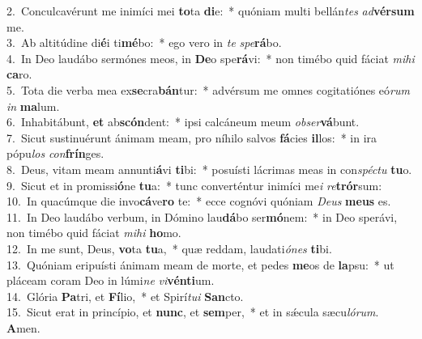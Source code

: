 {2.~}Conculcavérunt me inimíci mei \textbf{to}ta \textbf{di}e:~* quóniam multi bellán\textit{tes} \textit{ad}\textbf{vér}\textbf{sum} me.\\
{3.~}Ab altitúdine di\textbf{é}i ti\textbf{mé}bo:~* ego vero in \textit{te} \textit{spe}\textbf{rá}bo.\\
{4.~}In Deo laudábo sermónes meos, in \textbf{De}o spe\textbf{rá}vi:~* non timébo quid fáciat \textit{mi}\textit{hi} \textbf{ca}ro.\\
{5.~}Tota die verba mea ex\textbf{se}cra\textbf{bán}tur:~* advérsum me omnes cogitatiónes eó\textit{rum} \textit{in} \textbf{ma}lum.\\
{6.~}Inhabitábunt, \textbf{et} ab\textbf{scón}dent:~* ipsi calcáneum meum \textit{ob}\textit{ser}\textbf{vá}bunt.\\
{7.~}Sicut sustinuérunt ánimam meam, pro níhilo salvos \textbf{fá}cies \textbf{il}los:~* in ira pópu\textit{los} \textit{con}\textbf{frín}ges.\\
{8.~}Deus, vitam meam annunti\textbf{á}vi \textbf{ti}bi:~* posuísti lácrimas meas in con\textit{spé}\textit{ctu} \textbf{tu}o.\\
{9.~}Sicut et in promissi\textbf{ó}ne \textbf{tu}a:~* tunc converténtur inimíci me\textit{i} \textit{re}\textbf{trór}sum:\\
{10.~}In quacúmque die invo\textbf{cá}ve\textbf{ro} te:~* ecce cognóvi quóniam \textit{De}\textit{us} \textbf{me}\textbf{us} es.\\
{11.~}In Deo laudábo verbum, in Dómino lau\textbf{dá}bo ser\textbf{mó}nem:~* in Deo sperávi, non timébo quid fáciat \textit{mi}\textit{hi} \textbf{ho}mo.\\
{12.~}In me sunt, Deus, \textbf{vo}ta \textbf{tu}a,~* quæ reddam, laudati\textit{ó}\textit{nes} \textbf{ti}bi.\\
{13.~}Quóniam eripuísti ánimam meam de morte, et pedes \textbf{me}os de \textbf{la}psu:~* ut pláceam coram Deo in lúmi\textit{ne} \textit{vi}\textbf{vén}\textbf{ti}um.\\
{14.~}Glória \textbf{Pa}tri, et \textbf{Fí}lio,~* et Spirí\textit{tu}\textit{i} \textbf{San}cto.\\
{15.~}Sicut erat in princípio, et \textbf{nunc}, et \textbf{sem}per,~* et in sǽcula sæcu\textit{ló}\textit{rum}. \textbf{A}men.\\
